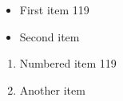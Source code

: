 \documentclass{article}
\begin{document}
\begin{itemize}
\item First item 119
\item Second item
\end{itemize}
\begin{enumerate}
\item Numbered item 119
\item Another item
\end{enumerate}
\end{document}
